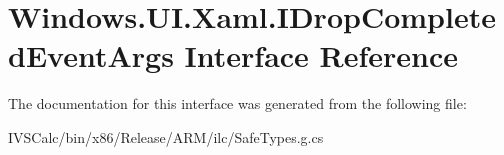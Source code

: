 \hypertarget{interface_windows_1_1_u_i_1_1_xaml_1_1_i_drop_completed_event_args}{}\section{Windows.\+U\+I.\+Xaml.\+I\+Drop\+Completed\+Event\+Args Interface Reference}
\label{interface_windows_1_1_u_i_1_1_xaml_1_1_i_drop_completed_event_args}


The documentation for this interface was generated from the following file\+:\begin{DoxyCompactItemize}
\item 
I\+V\+S\+Calc/bin/x86/\+Release/\+A\+R\+M/ilc/Safe\+Types.\+g.\+cs\end{DoxyCompactItemize}
